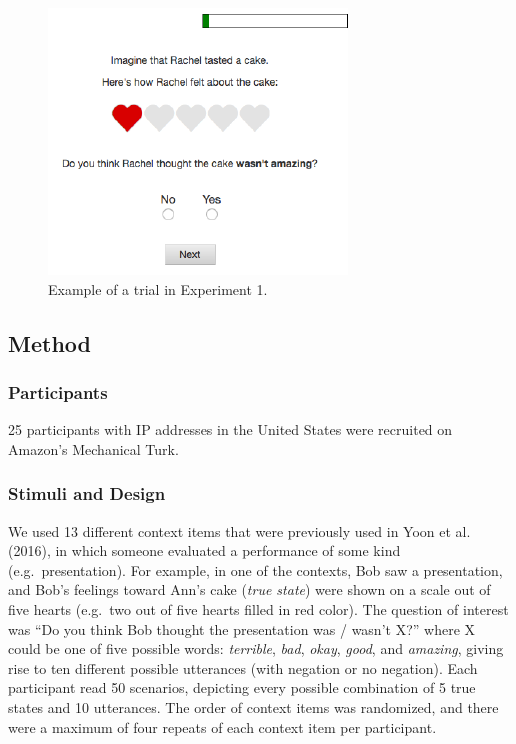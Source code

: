 \documentclass[10pt, letterpaper]{article}
\newenvironment{CodeChunk}{}{}
\begin{document}
\begin{CodeChunk}
\captionsetup{width=0.8\columnwidth}\begin{figure}[t]

{\centering \includegraphics{figs/expt1_screen-1} 

}

\caption[Example of a trial in Experiment 1]{Example of a trial in Experiment 1.}\label{fig:expt1_screen}
\end{figure}
\end{CodeChunk}

\subsection{Method}\label{method}

\subsubsection{Participants}\label{participants}

25 participants with IP addresses in the United States were recruited on
Amazon's Mechanical Turk.

\subsubsection{Stimuli and Design}\label{stimuli-and-design}

We used 13 different context items that were previously used in Yoon et
al. (2016), in which someone evaluated a performance of some kind
(e.g.~presentation). For example, in one of the contexts, Bob saw a
presentation, and Bob's feelings toward Ann's cake (\emph{true state})
were shown on a scale out of five hearts (e.g.~two out of five hearts
filled in red color). The question of interest was ``Do you think Bob
thought the presentation was / wasn't X?'' where X could be one of five
possible words: \emph{terrible}, \emph{bad}, \emph{okay}, \emph{good},
and \emph{amazing}, giving rise to ten different possible utterances
(with negation or no negation). Each participant read 50 scenarios,
depicting every possible combination of 5 true states and 10 utterances.
The order of context items was randomized, and there were a maximum of
four repeats of each context item per participant.
\end{document}
